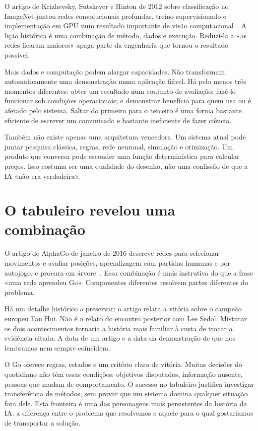 O artigo de Krizhevsky, Sutskever e Hinton de 2012 sobre classificação no ImageNet juntou redes convolucionais profundas, treino supervisionado e implementação em GPU num resultado importante de visão computacional~\citep{krizhevsky2012}. A lição histórica é uma combinação de método, dados e execução. Reduzi-la a «as redes ficaram maiores» apaga parte da engenharia que tornou o resultado possível.

Mais dados e computação podem alargar capacidades. Não transformam automaticamente uma demonstração numa aplicação fiável. Há pelo menos três momentos diferentes: obter um resultado num conjunto de avaliação; fazê-lo funcionar sob condições operacionais; e demonstrar benefício para quem usa ou é afetado pelo sistema. Saltar do primeiro para o terceiro é uma forma bastante eficiente de escrever um comunicado e bastante ineficiente de fazer ciência.

Também não existe apenas uma arquitetura vencedora. Um sistema atual pode juntar pesquisa clássica, regras, rede neuronal, simulação e otimização. Um produto que conversa pode esconder uma função determinística para calcular preços. Isso costuma ser uma qualidade do desenho, não uma confissão de que a IA «não era verdadeira».

\section{O tabuleiro revelou uma combinação}
O artigo de AlphaGo de janeiro de 2016 descreve redes para selecionar movimentos e avaliar posições, aprendizagem com partidas humanas e por autojogo, e procura em árvore~\citep{silver2016}. Essa combinação é mais instrutiva do que a frase «uma rede aprendeu Go». Componentes diferentes resolvem partes diferentes do problema.

Há um detalhe histórico a preservar: o artigo relata a vitória sobre o campeão europeu Fan Hui. Não é o relato do encontro posterior com Lee Sedol. Misturar os dois acontecimentos tornaria a história mais familiar à custa de trocar a evidência citada. A data de um artigo e a data da demonstração de que nos lembramos nem sempre coincidem.

O Go oferece regras, estados e um critério claro de vitória. Muitas decisões do quotidiano não têm essas condições: objetivos disputados, informação ausente, pessoas que mudam de comportamento. O sucesso no tabuleiro justifica investigar transferência de métodos, sem provar que um sistema domina qualquer situação fora dele. Esta fronteira é uma das personagens mais persistentes da história da IA: a diferença entre o problema que resolvemos e aquele para o qual gostaríamos de transportar a solução.


